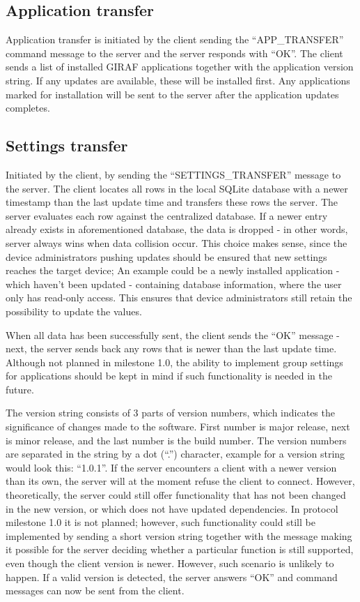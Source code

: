 \subsection{Application transfer}
Application transfer is initiated by the client sending the ``APP\_TRANSFER'' command message to the server and the server responds with ``OK''. The client sends a list of installed GIRAF applications together with the application version string. If any updates are available, these will be installed first. Any applications marked for installation will be sent to the server after the application updates completes.    

\subsection{Settings transfer}
Initiated by the client, by sending the ``SETTINGS\_TRANSFER'' message to the server. The client locates all rows in the local SQLite database with a newer timestamp than the last update time and transfers these rows the server. The server evaluates each row against the centralized database. If a newer entry already exists in aforementioned database, the data is dropped - in other words, server always wins when data collision occur. This choice makes sense, since the device administrators pushing updates should be ensured that new settings reaches the target device; An example could be a newly installed application - which haven't been updated - containing database information, where the user only has read-only access. This ensures that device administrators still retain the possibility to update the values.

When all data has been successfully sent, the client sends the ``OK'' message - next, the server sends back any rows that is newer than the last update time. Although not planned in milestone 1.0, the ability to implement group settings for applications should be kept in mind if such functionality is needed in the future. 

The version string consists of 3 parts of version numbers, which indicates the significance of changes made to the software. First number is major release, next is minor release, and the last number is the build number. The version numbers are separated in the string by a dot (``.'') character, example for a version string would look this: ``1.0.1''. If the server encounters a client with a newer version than its own, the server will at the moment refuse the client to connect. However, theoretically, the server could still offer functionality that has not been changed in the new version, or which does not have updated dependencies. In protocol milestone 1.0 it is not planned; however, such functionality could still be implemented by sending a short version string together with the message making it possible for the server deciding whether a particular function is still supported, even though the client version is newer. However, such scenario is unlikely to happen. 
If a valid version is detected, the server answers ``OK'' and command messages can now be sent from the client.

